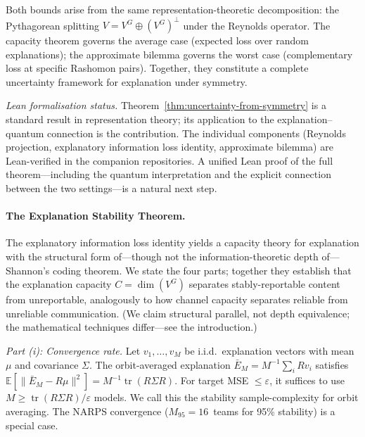 \documentclass[11pt,a4paper]{article}
\begin{document}
Both bounds arise from the same representation-theoretic decomposition: the Pythagorean splitting $V = V^G \oplus (V^G)^\perp$ under the Reynolds operator.  The capacity theorem governs the average case (expected loss over random explanations); the approximate bilemma governs the worst case (complementary loss at specific Rashomon pairs).  Together, they constitute a complete uncertainty framework for explanation under symmetry.

\emph{Lean formalisation status.}  Theorem~\ref{thm:uncertainty-from-symmetry} is a standard result in representation theory; its application to the explanation--quantum connection is the contribution.  The individual components (Reynolds projection, explanatory information loss identity, approximate bilemma) are Lean-verified in the companion repositories.  A unified Lean proof of the full theorem---including the quantum interpretation and the explicit connection between the two settings---is a natural next step.

\paragraph{The Explanation Stability Theorem.}
The explanatory information loss identity yields a capacity theory for explanation with the structural form of---though not the information-theoretic depth of---Shannon's coding theorem.  We state the four parts; together they establish that the explanation capacity $C = \dim(V^G)$ separates stably-reportable content from unreportable, analogously to how channel capacity separates reliable from unreliable communication.  (We claim structural parallel, not depth equivalence; the mathematical techniques differ---see the introduction.)

\emph{Part (i): Convergence rate.}  Let $v_1, \ldots, v_M$ be i.i.d.\ explanation vectors with mean $\mu$ and covariance $\Sigma$.  The orbit-averaged explanation $\bar{E}_M = M^{-1} \sum_i R v_i$ satisfies
$\mathbb{E}[\|\bar{E}_M - R\mu\|^2] = M^{-1} \operatorname{tr}(R\Sigma R)$.
For target MSE $\leq \varepsilon$, it suffices to use $M \geq \operatorname{tr}(R\Sigma R)/\varepsilon$ models.  We call this the stability sample-complexity for orbit averaging.  The NARPS convergence ($M_{95} = 16$~teams for 95\% stability) is a special case.
\end{document}
